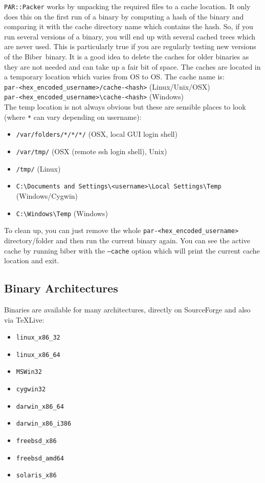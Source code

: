 \documentclass{ltxdockit}
\newcommand*{\biber}{Biber\xspace}
\begin{document}
\verb+PAR::Packer+ works by unpacking the required files to a cache
location. It only does this on the first run of a binary 
by computing a hash of the binary and comparing it with
the cache directory name which contains the hash. So, if you run
several versions of a binary, you will end up with several cached
trees which are never used. This is particularly true if you are regularly
testing new versions of the \biber\ binary. It is a good idea to
delete the caches for older binaries as they are not needed and can take up
a fair bit of space. The caches are located in a temporary location which
varies from OS to OS. The cache name is:\\[1ex]

\noindent\verb+par-<hex_encoded_username>/cache-<hash>+ (Linux/Unix/OSX)\\
\verb+par-<hex_encoded_username>\cache-<hash>+ (Windows)\\[1ex]

\noindent The temp location is not always obvious but these are sensible
places to look (where \verb+*+ can vary depending on username):

\begin{itemize}
\item \verb+/var/folders/*/*/*/+ (OSX, local GUI login shell)
\item \verb+/var/tmp/+ (OSX (remote ssh login shell), Unix)
\item \verb+/tmp/+ (Linux)
\item \verb+C:\Documents and Settings\<username>\Local Settings\Temp+ (Windows/Cygwin)
\item \verb+C:\Windows\Temp+ (Windows)
\end{itemize}

\noindent To clean up, you can just remove the whole \verb+par-<hex_encoded_username>+
directory/folder and then run the current binary again. You can see the active cache by running biber with the \texttt{--cache} option which will print the current cache location and exit.

\subsection{Binary Architectures}

Binaries are available for many architectures, directly on SourceForge and
also via \TeX Live:

\begin{itemize}
\item \verb+linux_x86_32+
\item \verb+linux_x86_64+
\item \verb+MSWin32+
\item \verb+cygwin32+
\item \verb+darwin_x86_64+
\item \verb+darwin_x86_i386+
\item \verb+freebsd_x86+\tpb
\item \verb+freebsd_amd64+\tpb
\item \verb+solaris_x86+\tpb
\end{itemize}
\end{document}
